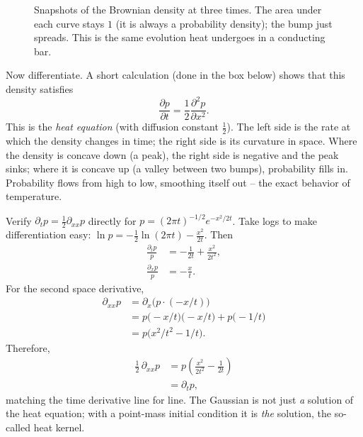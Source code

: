 \begin{figure}[H]
\centering
{}
\caption{Snapshots of the Brownian density at three times. The area under each
curve stays $1$ (it is always a probability density); the bump just spreads. This
is the same evolution heat undergoes in a conducting bar.}
\label{ch29:fig-heat}
\end{figure}

Now differentiate. A short calculation (done in the box below) shows that this
density satisfies
\[
  \boxed{\;\frac{\partial p}{\partial t} = \frac{1}{2}\frac{\partial^2 p}{\partial x^2}.\;}
\]
This is the \emph{heat equation} (with diffusion constant $\tfrac12$). The
left side is the rate at which the density changes in time; the right side is its
curvature in space. Where the density is concave down (a peak), the right side is
negative and the peak sinks; where it is concave up (a valley between two bumps),
probability fills in. Probability flows from high to low, smoothing itself out --
the exact behavior of temperature.

\begin{whybox}
Verify $\partial_t p = \tfrac12 \partial_{xx} p$ directly for
$p = (2\pi t)^{-1/2}e^{-x^2/2t}$. Take logs to make differentiation easy:
$\ln p = -\tfrac12\ln(2\pi t) - \tfrac{x^2}{2t}.$ Then
\begin{align*}
  \frac{\partial_t p}{p} &= -\frac{1}{2t} + \frac{x^2}{2t^2}, \\
  \frac{\partial_x p}{p} &= -\frac{x}{t}.
\end{align*}
For the second space derivative,
\begin{align*}
  \partial_{xx} p &= \partial_x\!\big(p\cdot(-x/t)\big) \\
  &= p\big(-x/t\big)\big(-x/t\big) + p\big(-1/t\big) \\
  &= p\big(x^2/t^2 - 1/t\big).
\end{align*}
Therefore,
\begin{align*}
  \tfrac{1}{2}\,\partial_{xx} p &= p\left(\frac{x^2}{2t^2}-\frac{1}{2t}\right) \\
  &= \partial_t p,
\end{align*}
matching the time derivative line for line. The Gaussian is not just \emph{a}
solution of the heat equation; with a point-mass initial condition it is \emph{the}
solution, the so-called heat kernel.
\end{whybox}

